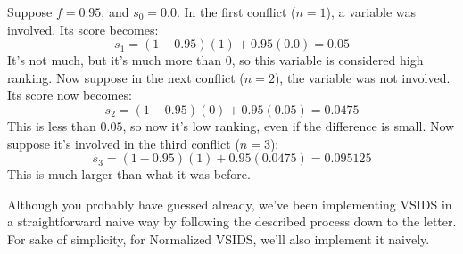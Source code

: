 \documentclass[../main.tex]{subfiles}
\begin{document}
\begin{center}
    Suppose $f = 0.95$, and $s_0 = 0.0$. In the first conflict ($n = 1$),
    a variable was involved. Its score becomes:
    $$s_1 = (1 - 0.95)(1) + 0.95(0.0) = 0.05$$
    It's not much, but it's much more than 0, so this variable is considered 
    high ranking. Now suppose in the next conflict ($n = 2$), the variable was 
    not involved. Its score now becomes:
    $$s_2 = (1 - 0.95)(0) + 0.95(0.05) = 0.0475$$
    This is less than $0.05$, so now it's low ranking, even if the difference is small.
    Now suppose it's involved in the third conflict ($n = 3$):
    $$s_3 = (1 - 0.95)(1) + 0.95(0.0475) = 0.095125$$
    This is much larger than what it was before.
\end{center}

Although you probably have guessed already, we've been implementing VSIDS 
in a straightforward naive way by following the described process down to the letter. 
For sake of simplicity, for Normalized VSIDS, we'll also implement it naively.
\end{document}
